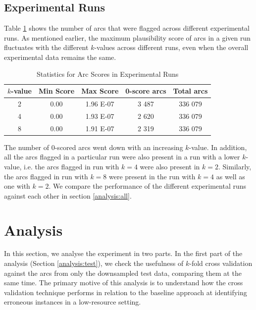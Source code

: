\subsection{Experimental Runs}
\label{statistics:experiments}

Table \ref{tab:absminmax} shows the number of arcs that were flagged across different experimental runs. As mentioned earlier, the maximum plausibility score of arcs in a given run fluctuates with the different \(k\)-values across different runs, even when the overall experimental data remains the same.

\begin{table}[H]
    \centering
    \begin{tabular}{|c|c|c|c|c|}
    \hline
    \textbf{\(k\)-value} & \textbf{Min Score} & \textbf{Max Score} & \textbf{0-score arcs} & \textbf{Total arcs}\\
    \hline
    \hline
    2 & 0.00 & 1.96 E-07 & 3 487 & 336 079 \\
    4 & 0.00 & 1.93 E-07 & 2 620 & 336 079 \\
    8 & 0.00 & 1.91 E-07 & 2 319 & 336 079 \\
    \hline
    \end{tabular}
    \caption{Statistics for Arc Scores in Experimental Runs}
    \label{tab:absminmax}
\end{table}

The number of 0-scored arcs went down with an increasing \(k\)-value. In addition, all the arcs flagged in a particular run were also present in a run with a lower \(k\)-value, i.e. the arcs flagged in run with \(k=4\) were also present in \(k=2\). Similarly, the arcs flagged in run with \(k=8\) were present in the run with \(k=4\) as well as one with \(k=2\). We compare the performance of the different experimental runs against each other in section \ref{analysis:all}.

\section{Analysis}
\label{compare:lisca}

In this section, we analyse the experiment in two parts. In the first part of the analysis (Section \ref{analysis:test}), we check the usefulness of \(k\)-fold cross validation against the arcs from only the downsampled test data, comparing them at the same time. The primary motive of this analysis is to understand how the cross validation technique performs in relation to the baseline approach at identifying erroneous instances in a low-resource setting.

